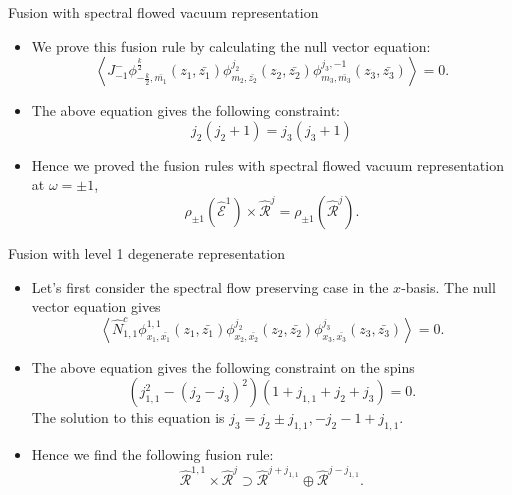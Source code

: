 \documentclass{beamer}
\newcommand{\vev}[1]{\left\langle #1 \right\rangle}
\begin{document}
\begin{frame}{Fusion with spectral flowed vacuum representation}
  \begin{itemize}
    \item We prove this fusion rule by calculating the null vector equation:
      \begin{equation}
            \vev{J^{-}_{-1} \phi^{\frac{k}{2}}_{-\frac{k}{2},\bar{m_{1}}}(z_{1},\bar{z_{1}}) \phi^{j_{2}}_{m_{2},\bar{z_{2}}}(z_{2},\bar{z_{2}}) 
            \phi^{j_{3},-1}_{m_{3},\bar{m_{3}}}(z_{3},\bar{z_{3}})} = 0.
      \end{equation}
    \item The above equation gives the following constraint:
      \begin{equation}
        j_{2}(j_{2}+1) = j_{3} (j_{3}+1)
      \end{equation}
    \item Hence we proved the fusion rules with spectral flowed vacuum representation at $\omega = \pm 1$, 
      \begin{equation}
          \rho_{\pm 1} \left( \hat{\mathcal{E}}^{1} \right) \times \hat{\mathcal{R}}^{j} = \rho_{\pm 1} \left( \hat{\mathcal{R}}^{j} \right).
      \end{equation}
  \end{itemize}
\end{frame}

\begin{frame}{Fusion with level 1 degenerate representation}
  \begin{itemize}
    \item Let's first consider the spectral flow preserving case in the $x$-basis. The null vector equation gives
      \begin{equation}
        \vev{\hat{N}^{c}_{1,1} \phi^{1,1}_{x_{1},\bar{x_{1}}}(z_{1},\bar{z_{1}}) \phi^{j_{2}}_{x_{2},\bar{x_{2}}}(z_{2},\bar{z_{2}}) \phi^{j_{3}}_{x_{3},\bar{x_{3}}}(z_{3},\bar{z_{3}})} = 0. 
      \end{equation}
    \item The above equation gives the following constraint on the spins 
      \begin{equation}
        \left( j_{1,1}^{2} - (j_{2}-j_{3})^{2} \right)(1+j_{1,1}+j_{2}+j_{3}) = 0.
      \end{equation}
      The solution to this equation is $j_{3} = j_{2} \pm j_{1,1}, -j_{2} - 1 + j_{1,1}$. 
    \item Hence we find the following fusion rule: 
      \begin{equation}
        \hat{\mathcal{R}}^{1,1} \times \hat{\mathcal{R}}^{j} \supset \hat{\mathcal{R}}^{j+j_{1,1}} \oplus \hat{\mathcal{R}}^{j-j_{1,1}}.
      \end{equation}
  \end{itemize}
\end{frame}
\end{document}
